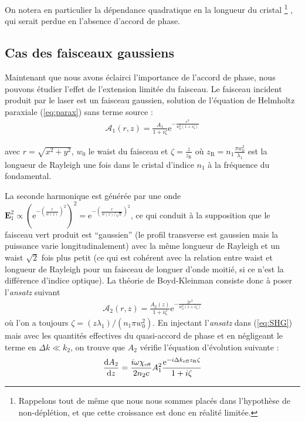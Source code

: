 \documentclass[11pt,a4paper] { article}
\newcommand{\zr}{z_\mathsc{R}}
\newcommand{\A}{\mathcal{A}}
\newcommand{\e}[1]{\text{e}^{#1}}
\newcommand{\mathsc}[1]{\mathrm{\scriptscriptstyle {#1}}}
\renewcommand{\v}[1]{\boldsymbol{\mathbf{#1}}}
\begin{document}
On notera en particulier la dépendance quadratique en la longueur du cristal \footnote{Rappelons tout de même que nous nous sommes placés dans l'hypothèse de non-déplétion, et que cette croissance est donc en réalité limitée.}
, qui serait perdue en l'absence d'accord de phase. 

\subsection{Cas des faisceaux gaussiens} 

Maintenant que nous avons éclairci l'importance de l'accord de phase, nous pouvons étudier l'effet de l'extension limitée du faisceau. Le faisceau incident produit par le laser est un faisceau gaussien, solution de l'équation de Helmholtz paraxiale (\ref{eq:parax}) sans terme source :
\begin{align}
\A_1(r,z) = \frac{A_1}{1+i\zeta} \e{-\frac{r^{2}}{w_{0}^{2} (1+i\zeta) }}
\end{align}

avec $r=\sqrt{x^2+y^2}$, $w_0$ le waist du faisceau et $\zeta = \frac{z}{z_\mathsc{R}}$ où $\zr= n_1 \frac{\pi w_0^2}{\lambda_1}$ est la longueur de Rayleigh une fois dans le cristal d'indice $n_1$ à la fréquence du fondamental.

La seconde harmonique est générée par une onde $\v E_1^2 \propto \left( \e{-\left(\frac{r}{w(z)}\right)^2} \right)^2 = \e{-\left(\frac{r}{w(z)/ \sqrt 2}\right)^2}$, ce qui conduit à la supposition que le faisceau vert produit est ``gaussien'' (le profil transverse est gaussien mais la puissance varie longitudinalement) avec la même longueur de Rayleigh et un waist $\sqrt 2$ fois plus petit (ce qui est cohérent avec la relation entre waist et longueur de Rayleigh pour un faisceau de longuer d'onde moitié, si ce n'est la différence d'indice optique).
La théorie de Boyd-Kleinman consiste donc à poser l'\textit{ansatz} suivant 
\begin{align}
\A_2(r,z) = \frac{A_2(z)}{1+i\zeta}\e{-\frac{2r^{2}}{w_{0}^{2} (1+i\zeta) }} 
\end{align}
où l'on a toujours $\zeta = (z\lambda_1)/(n_1 \pi w_{0}^{2})$. %
En injectant l'\textit{ansatz} dans (\ref{eq:SHG}) mais avec les quantités effectives du quasi-accord de phase et en négligeant le terme en $\Delta k \ll k_2$, on trouve que $A_2$ vérifie l'équation d'évolution suivante :
\begin{align} 
	\dv{A_2}{z} = \frac{i\omega \chi_\mathsc{eff}}{2 n_2 c} A_1^2 \frac{\e{-i\Delta k_\mathsc{eff} \zr \zeta}}{1+i\zeta} 
	\label{eq:BKDE}
\end{align}
\end{document}

